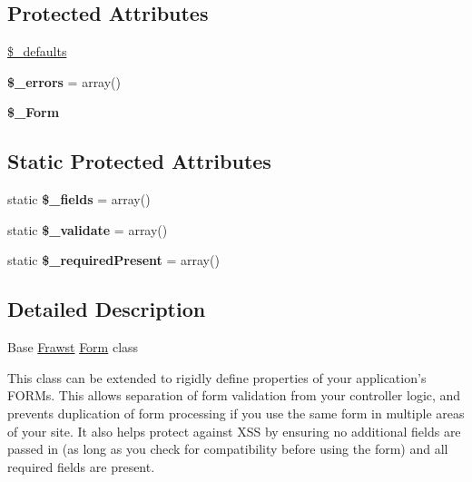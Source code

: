 \subsection*{Protected Attributes}
\begin{DoxyCompactItemize}
\item 
\hyperlink{classForm_a25f4ad782d570833cbd0320fd949651c}{\$\_\-defaults}
\item 
\hypertarget{classForm_a6588411906ebc9b77538fd35c66b6061}{
{\bfseries \$\_\-errors} = array()}
\label{classForm_a6588411906ebc9b77538fd35c66b6061}

\item 
\hypertarget{classForm_a99adb61969412070e68825ee27977a82}{
{\bfseries \$\_\-Form}}
\label{classForm_a99adb61969412070e68825ee27977a82}

\end{DoxyCompactItemize}
\subsection*{Static Protected Attributes}
\begin{DoxyCompactItemize}
\item 
\hypertarget{classForm_a2ae01dc28ade07ea33443d58e1f3ff35}{
static {\bfseries \$\_\-fields} = array()}
\label{classForm_a2ae01dc28ade07ea33443d58e1f3ff35}

\item 
\hypertarget{classForm_ae7b9bcff478aa176d7cbc6ad31cf0224}{
static {\bfseries \$\_\-validate} = array()}
\label{classForm_ae7b9bcff478aa176d7cbc6ad31cf0224}

\item 
\hypertarget{classForm_a10c62b840cbdcdab634fa121b935c03f}{
static {\bfseries \$\_\-requiredPresent} = array()}
\label{classForm_a10c62b840cbdcdab634fa121b935c03f}

\end{DoxyCompactItemize}


\subsection{Detailed Description}
Base \hyperlink{classFrawst}{Frawst} \hyperlink{classForm}{Form} class

This class can be extended to rigidly define properties of your application's FORMs. This allows separation of form validation from your controller logic, and prevents duplication of form processing if you use the same form in multiple areas of your site. It also helps protect against XSS by ensuring no additional fields are passed in (as long as you check for compatibility before using the form) and all required fields are present.

